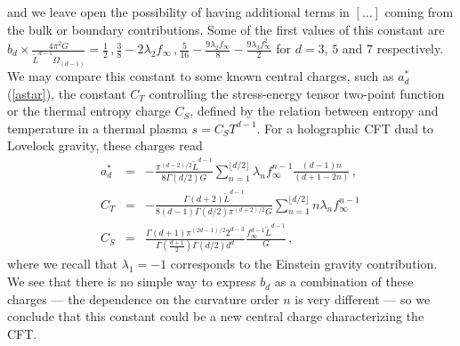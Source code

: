 \documentclass[11pt,letterpaper]{article}
\begin{document}
and we leave open the possibility of having additional terms in $[\ldots]$ coming from the bulk or boundary contributions. Some of the first values of this constant are $b_d\times \frac{4\pi^2 G}{\tilde L^{d-1}\Omega_{(d-1)}}=\frac{1}{2}\, ,\frac{3}{8}-2\lambda_2 f_{\infty}\, ,\frac{5}{16}-\frac{9 \lambda _2 f_{\infty}}{8}-\frac{9 \lambda _3 f_{\infty}^2}{2}$ for $d=3$, $5$ and $7$ respectively. We may compare this constant to some known central charges, such as $a_d^*$ (\ref{astar}), the constant $C_T$ controlling the stress-energy tensor two-point function or the thermal entropy charge $C_S$, defined by the relation between entropy and temperature in a thermal plasma $s=C_S T^{d-1}$. For a holographic CFT dual to Lovelock gravity, these charges read
\begin{eqnarray}
a^*_d&=&-\frac{\pi^{(d-2)/2}\tilde L^{d-1}}{8\Gamma(d/2) G}\sum_{n=1}^{\lfloor d/2\rfloor}\lambda_n f_{\infty}^{n-1}\frac{(d-1)n}{(d+1-2n)}\, ,\\
C_T&=&-\frac{\Gamma(d+2)\tilde L^{d-1}}{8(d-1)\Gamma(d/2)\pi^{(d+2)/2 }G}\sum_{n=1}^{\lfloor d/2\rfloor}n\lambda_n f_{\infty}^{n-1}\, \\
C_S&=&\frac{\Gamma(d+1)\pi^{(2d-1)/2}2^{d-3}}{\Gamma\left(\frac{d+1}{2}\right)\Gamma(d/2)d^d}\frac{f_{\infty}^{d-1}\tilde L^{d-1}}{G}\, ,
\end{eqnarray}
where we recall that $\lambda_1=-1$ corresponds to the Einstein gravity contribution. We see that there is no simple way to express $b_d$ as a combination of these charges --- the dependence on the curvature order $n$ is very different --- so we conclude that this constant could be a new central charge characterizing the CFT.
\end{document}

